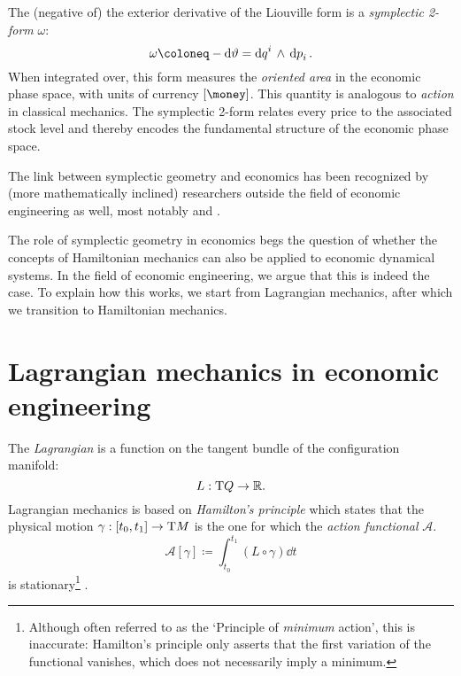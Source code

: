 The (negative of) the exterior derivative of the Liouville form is a \emph{symplectic 2-form} \(\omega\):
\begin{equation}
    \omega \coloneq -\dd{\theta} = \wedgep{\dd{q}^i}{\dd{p}_i}.
\end{equation}
When integrated over, this form measures the \emph{oriented area} in the economic phase space, with units of currency \([\si{\money}]\). This quantity is analogous to \emph{action} in classical mechanics. The symplectic 2-form relates every price to the associated stock level and thereby encodes the fundamental structure of the economic phase space.  

The link between symplectic geometry and economics has been recognized by (more mathematically inclined) researchers outside the field of economic engineering as well, most notably \citet{Russell2011} and \citet{Swierstra2014}.

The role of symplectic geometry in economics begs the question of whether the concepts of Hamiltonian mechanics can also be applied to economic dynamical systems. In the field of economic engineering, we argue that this is indeed the case. To explain how this works, we start from Lagrangian mechanics, after which we transition to Hamiltonian mechanics.

\section{Lagrangian mechanics in economic engineering}
\label{sec:lagrangian_ee}

The \emph{Lagrangian} is a function on the tangent bundle of the configuration manifold:
\begin{equation}
     L : \mathrm{T}Q \to \mathbb{R}.
\end{equation}
Lagrangian mechanics is based on \emph{Hamilton's principle} which states that the physical motion \(\gamma: \interval{t_0}{t_1} \to \tbundle{M}\) is the one for which the \emph{action functional} $\mathscr{A}$.
\begin{equation}
    \mathscr{A}[\gamma] \coloneq \int_{t_0}^{t_1} (L\circ\gamma)\dd{t}
\end{equation}
is stationary\footnote{Although often referred to as the `Principle of \emph{minimum} action', this is inaccurate: Hamilton's principle only asserts that the first variation of the functional vanishes, which does not necessarily imply a minimum.} \cite{Arnold1989}.


